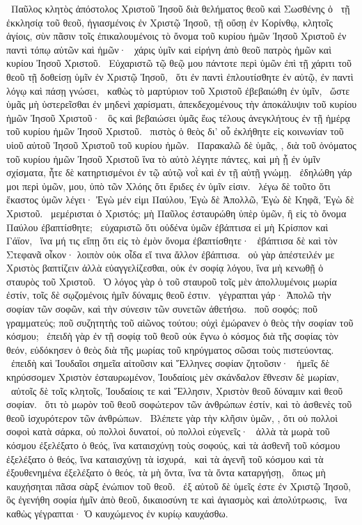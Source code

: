 
~Παῦλος κλητὸς ἀπόστολος Χριστοῦ Ἰησοῦ διὰ θελήματος θεοῦ καὶ Σωσθένης ὁ 
~τῇ ἐκκλησίᾳ τοῦ θεοῦ, ἡγιασμένοις ἐν Χριστῷ Ἰησοῦ, τῇ οὔσῃ ἐν Κορίνθῳ, κλητοῖς ἁγίοις, σὺν πᾶσιν τοῖς ἐπικαλουμένοις τὸ ὄνομα τοῦ κυρίου ἡμῶν Ἰησοῦ Χριστοῦ ἐν παντὶ τόπῳ αὐτῶν καὶ ἡμῶν·
~χάρις ὑμῖν καὶ εἰρήνη ἀπὸ θεοῦ πατρὸς ἡμῶν καὶ κυρίου Ἰησοῦ Χριστοῦ.
~Εὐχαριστῶ τῷ θεῷ μου πάντοτε περὶ ὑμῶν ἐπὶ τῇ χάριτι τοῦ θεοῦ τῇ δοθείσῃ ὑμῖν ἐν Χριστῷ Ἰησοῦ,
~ὅτι ἐν παντὶ ἐπλουτίσθητε ἐν αὐτῷ, ἐν παντὶ λόγῳ καὶ πάσῃ γνώσει,
~καθὼς τὸ μαρτύριον τοῦ Χριστοῦ ἐβεβαιώθη ἐν ὑμῖν,
~ὥστε ὑμᾶς μὴ ὑστερεῖσθαι ἐν μηδενὶ χαρίσματι, ἀπεκδεχομένους τὴν ἀποκάλυψιν τοῦ κυρίου ἡμῶν Ἰησοῦ Χριστοῦ·
~ὃς καὶ βεβαιώσει ὑμᾶς ἕως τέλους ἀνεγκλήτους ἐν τῇ ἡμέρᾳ τοῦ κυρίου ἡμῶν Ἰησοῦ Χριστοῦ.
~πιστὸς ὁ θεὸς δι’ οὗ ἐκλήθητε εἰς κοινωνίαν τοῦ υἱοῦ αὐτοῦ Ἰησοῦ Χριστοῦ τοῦ κυρίου ἡμῶν.
~Παρακαλῶ δὲ ὑμᾶς, , διὰ τοῦ ὀνόματος τοῦ κυρίου ἡμῶν Ἰησοῦ Χριστοῦ ἵνα τὸ αὐτὸ λέγητε πάντες, καὶ μὴ ᾖ ἐν ὑμῖν σχίσματα, ἦτε δὲ κατηρτισμένοι ἐν τῷ αὐτῷ νοῒ καὶ ἐν τῇ αὐτῇ γνώμῃ.
~ἐδηλώθη γάρ μοι περὶ ὑμῶν,  μου, ὑπὸ τῶν Χλόης ὅτι ἔριδες ἐν ὑμῖν εἰσιν.
~λέγω δὲ τοῦτο ὅτι ἕκαστος ὑμῶν λέγει· Ἐγὼ μέν εἰμι Παύλου, Ἐγὼ δὲ Ἀπολλῶ, Ἐγὼ δὲ Κηφᾶ, Ἐγὼ δὲ Χριστοῦ.
~μεμέρισται ὁ Χριστός; μὴ Παῦλος ἐσταυρώθη ὑπὲρ ὑμῶν, ἢ εἰς τὸ ὄνομα Παύλου ἐβαπτίσθητε;
~εὐχαριστῶ ὅτι οὐδένα ὑμῶν ἐβάπτισα εἰ μὴ Κρίσπον καὶ Γάϊον,
~ἵνα μή τις εἴπῃ ὅτι εἰς τὸ ἐμὸν ὄνομα ἐβαπτίσθητε·
~ἐβάπτισα δὲ καὶ τὸν Στεφανᾶ οἶκον· λοιπὸν οὐκ οἶδα εἴ τινα ἄλλον ἐβάπτισα.
~οὐ γὰρ ἀπέστειλέν με Χριστὸς βαπτίζειν ἀλλὰ εὐαγγελίζεσθαι, οὐκ ἐν σοφίᾳ λόγου, ἵνα μὴ κενωθῇ ὁ σταυρὸς τοῦ Χριστοῦ.
~Ὁ λόγος γὰρ ὁ τοῦ σταυροῦ τοῖς μὲν ἀπολλυμένοις μωρία ἐστίν, τοῖς δὲ σῳζομένοις ἡμῖν δύναμις θεοῦ ἐστιν.
~γέγραπται γάρ· Ἀπολῶ τὴν σοφίαν τῶν σοφῶν, καὶ τὴν σύνεσιν τῶν συνετῶν ἀθετήσω.
~ποῦ σοφός; ποῦ γραμματεύς; ποῦ συζητητὴς τοῦ αἰῶνος τούτου; οὐχὶ ἐμώρανεν ὁ θεὸς τὴν σοφίαν τοῦ κόσμου;
~ἐπειδὴ γὰρ ἐν τῇ σοφίᾳ τοῦ θεοῦ οὐκ ἔγνω ὁ κόσμος διὰ τῆς σοφίας τὸν θεόν, εὐδόκησεν ὁ θεὸς διὰ τῆς μωρίας τοῦ κηρύγματος σῶσαι τοὺς πιστεύοντας.
~ἐπειδὴ καὶ Ἰουδαῖοι σημεῖα αἰτοῦσιν καὶ Ἕλληνες σοφίαν ζητοῦσιν·
~ἡμεῖς δὲ κηρύσσομεν Χριστὸν ἐσταυρωμένον, Ἰουδαίοις μὲν σκάνδαλον ἔθνεσιν δὲ μωρίαν,
~αὐτοῖς δὲ τοῖς κλητοῖς, Ἰουδαίοις τε καὶ Ἕλλησιν, Χριστὸν θεοῦ δύναμιν καὶ θεοῦ σοφίαν.
~ὅτι τὸ μωρὸν τοῦ θεοῦ σοφώτερον τῶν ἀνθρώπων ἐστίν, καὶ τὸ ἀσθενὲς τοῦ θεοῦ ἰσχυρότερον τῶν ἀνθρώπων.
~Βλέπετε γὰρ τὴν κλῆσιν ὑμῶν, , ὅτι οὐ πολλοὶ σοφοὶ κατὰ σάρκα, οὐ πολλοὶ δυνατοί, οὐ πολλοὶ εὐγενεῖς·
~ἀλλὰ τὰ μωρὰ τοῦ κόσμου ἐξελέξατο ὁ θεός, ἵνα καταισχύνῃ τοὺς σοφούς, καὶ τὰ ἀσθενῆ τοῦ κόσμου ἐξελέξατο ὁ θεός, ἵνα καταισχύνῃ τὰ ἰσχυρά,
~καὶ τὰ ἀγενῆ τοῦ κόσμου καὶ τὰ ἐξουθενημένα ἐξελέξατο ὁ θεός, τὰ μὴ ὄντα, ἵνα τὰ ὄντα καταργήσῃ,
~ὅπως μὴ καυχήσηται πᾶσα σὰρξ ἐνώπιον τοῦ θεοῦ.
~ἐξ αὐτοῦ δὲ ὑμεῖς ἐστε ἐν Χριστῷ Ἰησοῦ, ὃς ἐγενήθη σοφία ἡμῖν ἀπὸ θεοῦ, δικαιοσύνη τε καὶ ἁγιασμὸς καὶ ἀπολύτρωσις,
~ἵνα καθὼς γέγραπται· Ὁ καυχώμενος ἐν κυρίῳ καυχάσθω.

